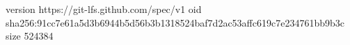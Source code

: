 version https://git-lfs.github.com/spec/v1
oid sha256:91cc7e61a5d3b6944b5d56b3b1318524baf7d2ac53affc619c7e234761bb9b3c
size 524384
